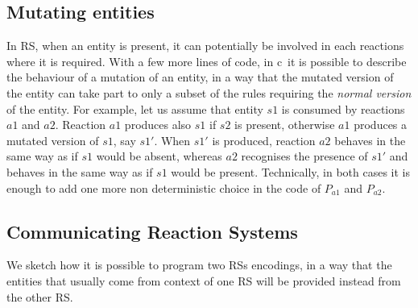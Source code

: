 \subsection{Mutating entities} 
In RS, when an entity is present, it can potentially be involved in each reactions where it is required.
With a few more lines of code, in c\CNA~it is possible to describe the behaviour of a mutation of 
an entity, in a way that the mutated version of the entity can take 
part to only a subset of the rules requiring  the  \emph{normal version} of the entity.
For example, let us assume that entity $s1$ is consumed by reactions $a1$ and $a2$.
Reaction $a1$ produces also $s1$ if $s2$ is present, otherwise $a1$ produces a mutated version of $s1$, 
say $s1'$.
When $s1'$ is produced, reaction $a2$ behaves in the same way as if $s1$ would be absent, whereas $a2$
recognises the presence of $s1'$ and behaves in the same way as if $s1$ would be present.
Technically, in both cases it is enough to add one more non 
deterministic choice in the code of $P_{a1}$ and $P_{a2}$. 


\subsection{Communicating Reaction Systems} 
We sketch how it is possible to program two RSs encodings, in a way that 
the entities that usually come from context of one RS will be provided instead from the other RS. 


